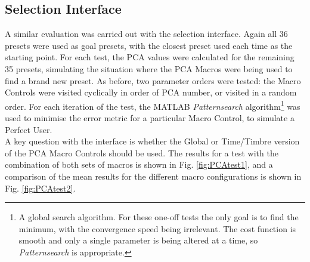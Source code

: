 \documentclass[11pt, oneside]{report}   	%
\begin{document}
\subsection{Selection Interface}\label{sec:SelectionEval}
A similar evaluation was carried out with the selection interface. Again all 36 presets were used as goal presets, with the closest preset used each time as the starting point. For each test, the PCA values were calculated for the remaining 35 presets, simulating the situation where the PCA Macros were being used to find a brand new preset. As before, two parameter orders were tested: the Macro Controls were visited cyclically in order of PCA number, or visited in a random order. For each iteration of the test, the MATLAB \emph{Patternsearch} algorithm\footnote{A global search algorithm. For these one-off tests the only goal is to find the minimum, with the convergence speed being irrelevant. The cost function is smooth and only a single parameter is being altered at a time, so \emph{Patternsearch} is appropriate.} was used to minimise the error metric for a particular Macro Control, to simulate a Perfect User.\\ 
A key question with the interface is whether the Global or Time/Timbre version of the PCA Macro Controls should be used. The results for a test with the combination of both sets of macros is shown in Fig. \ref{fig:PCAtest1}, and a comparison of the mean results for the different macro configurations is shown in Fig. \ref{fig:PCAtest2}.
\end{document}
